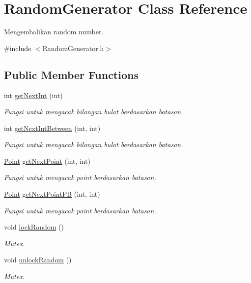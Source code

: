 \hypertarget{class_random_generator}{}\section{Random\+Generator Class Reference}
\label{class_random_generator}


Mengembalikan random number.  




{\ttfamily \#include $<$Random\+Generator.\+h$>$}

\subsection*{Public Member Functions}
\begin{DoxyCompactItemize}
\item 
int \hyperlink{class_random_generator_a7bdfd5b421ffaa1de622804fee51c3eb}{get\+Next\+Int} (int)
\begin{DoxyCompactList}\small\item\em Fungsi untuk mengacak bilangan bulat berdasarkan batasan. \end{DoxyCompactList}\item 
int \hyperlink{class_random_generator_ab230d076577cb8a5719b866ad2d23460}{get\+Next\+Int\+Between} (int, int)
\begin{DoxyCompactList}\small\item\em Fungsi untuk mengacak bilangan bulat berdasarkan batasan. \end{DoxyCompactList}\item 
\hyperlink{class_point}{Point} \hyperlink{class_random_generator_a4c6407b76023eed6f10e58996c0fdcae}{get\+Next\+Point} (int, int)
\begin{DoxyCompactList}\small\item\em Fungsi untuk mengacak point berdasarkan batasan. \end{DoxyCompactList}\item 
\hyperlink{class_point}{Point} \hyperlink{class_random_generator_a69f7d43d8f1ce21306612eb939e4f347}{get\+Next\+Point\+PB} (int, int)
\begin{DoxyCompactList}\small\item\em Fungsi untuk mengacak point berdasarkan batasan. \end{DoxyCompactList}\item 
void \hyperlink{class_random_generator_a8e8c1e6e1f4cc57c2bd463cf26903110}{lock\+Random} ()
\begin{DoxyCompactList}\small\item\em Mutex. \end{DoxyCompactList}\item 
void \hyperlink{class_random_generator_affa68e83ee3598b50cf9de4fd093fe6a}{unlock\+Random} ()
\begin{DoxyCompactList}\small\item\em Mutex. \end{DoxyCompactList}\end{DoxyCompactItemize}
